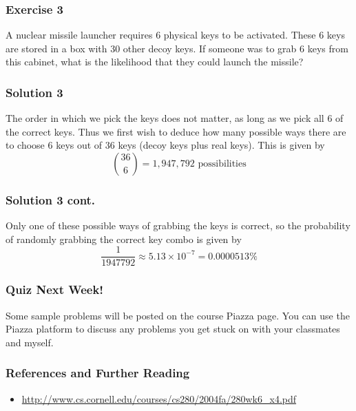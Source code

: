\documentclass{beamer}
\newcommand{\<}{\langle}
\renewcommand{\>}{\rangle}
\begin{document}
\begin{frame}
\frametitle{Exercise 3}

A nuclear missile launcher requires 6 physical keys to be activated. These 6 keys are stored in a box with 30 other decoy keys. If someone was to grab 6 keys from this cabinet, what is the likelihood that they could launch the missile?
\end{frame}

\begin{frame}
\frametitle{Solution 3}

The order in which we pick the keys does not matter, as long as we pick all 6 of the correct keys. Thus we first wish to deduce how many possible ways there are to choose 6 keys out of 36 keys (decoy keys plus real keys). This is given by
\[
{36 \choose 6} = 1,947,792 \text{ possibilities}
\]
\end{frame}

\begin{frame}
\frametitle{Solution 3 cont.}

Only one of these possible ways of grabbing the keys is correct, so the probability of randomly grabbing the correct key combo is given by
\[
\frac{1}{1947792} \approx 5.13 \times 10^{-7} = 0.0000513 \%
\]
\end{frame}


\begin{frame}
\frametitle{Quiz Next Week!}

Some sample problems will be posted on the course Piazza page. You can use the Piazza platform to discuss any problems you get stuck on with your classmates and myself.
\end{frame}

\begin{frame}
\frametitle{References and Further Reading}

\begin{itemize}
\item \url{http://www.cs.cornell.edu/courses/cs280/2004fa/280wk6_x4.pdf}
\end{itemize}
\end{frame}
\end{document}
